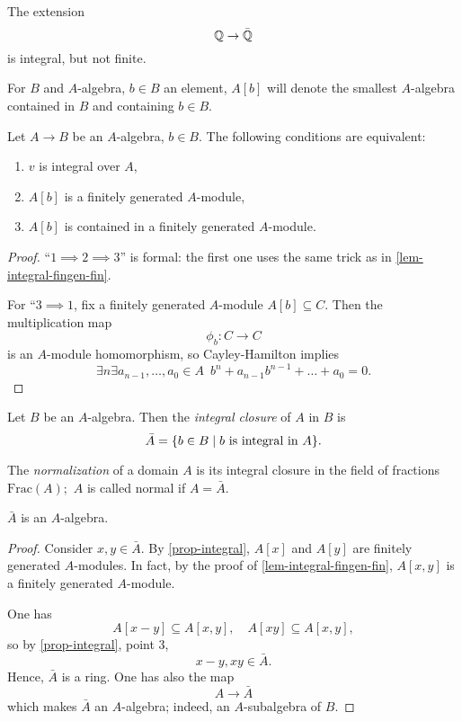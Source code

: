 \begin{example}
  The extension
  \[ \mathbb Q \to \bar {\mathbb Q}\]
  is integral, but not finite.
\end{example}

\begin{df}
  For $B$ and $A$-algebra, $b \in B$ an element, $A[b]$ will denote the smallest $A$-algebra contained in $B$ and containing $b \in B$.
\end{df}

\begin{prop}
  \label{prop-integral}
  Let $A \to B$ be an $A$-algebra, $b \in B$. The following conditions are equivalent:
  \begin{enumerate}
  \item $v$ is integral over $A$,
  \item $A[b]$ is a finitely generated $A$-module,
  \item $A[b]$ is contained in a finitely generated $A$-module.
  \end{enumerate}
\end{prop}
\begin{proof}
  ``$1 \implies 2 \implies 3$'' is formal: the first one uses the same trick as in \cref{lem-integral-fingen-fin}.

  For ``$ 3 \implies 1$, fix a finitely generated $A$-module $A[b] \subseteq C$. Then the multiplication map
  \[ \phi_b \colon C \to C\]
  is an \(A\)-module homomorphism, so Cayley-Hamilton implies
  \[ \exists n \exists a_{n-1}, \dotsc, a_0 \in A \enspace b^n + a_{n-1} b^{n-1} + \dotso + a_0 = 0.\]
\end{proof}

\begin{df}
  Let $B$ be an $A$-algebra. Then the \textit{integral closure} of $A$ in $B$ is
  \[ \bar A = \{ b \in B \mathrel{|} \text{$b$ is integral in $A$}\}.\]

  The \textit{normalization} of a domain $A$ is its integral closure in the field of fractions $\text{Frac}(A);$ \(A\) is called normal if \(A = \bar{A}.\)
\end{df}


\begin{corollary}
  $\bar A$ is an $A$-algebra.
\end{corollary}
\begin{proof}
  Consider $x, y \in \bar A$. By \cref{prop-integral}, $A[x]$ and $A[y]$ are finitely generated $A$-modules. In fact, by the proof of \cref{lem-integral-fingen-fin}, $A[x, y]$ is a finitely generated $A$-module.

  One has
  \[ A[x - y] \subseteq A[x,y], \quad A[xy] \subseteq A[x, y],\]
  so by \cref{prop-integral}, point 3,
  \[ x- y, xy \in \bar A.\]
  Hence, $\bar A$ is a ring. One has also the map
  \[ A \to \bar A\]
  which makes $\bar A$ an $A$-algebra; indeed, an $A$-subalgebra of $B$.
\end{proof}

